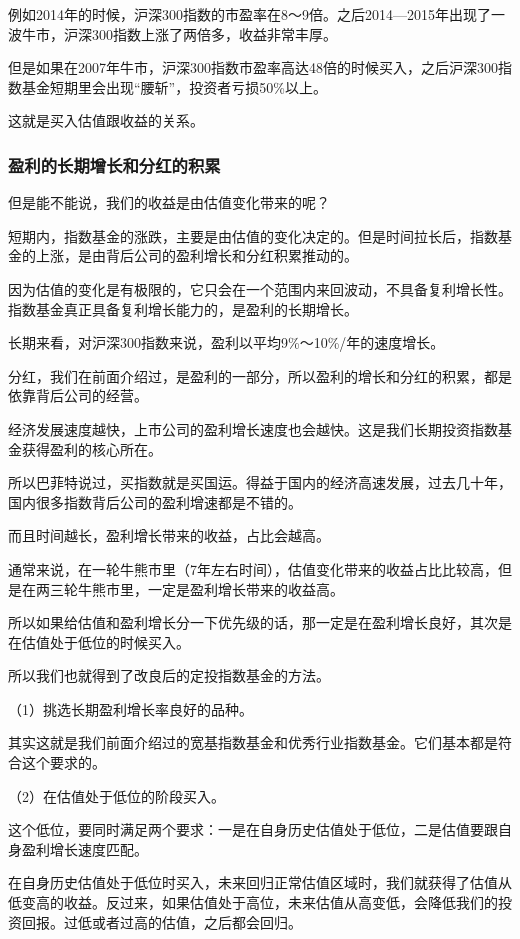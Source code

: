例如2014年的时候，沪深300指数的市盈率在8～9倍。之后2014—2015年出现了一波牛市，沪深300指数上涨了两倍多，收益非常丰厚。

但是如果在2007年牛市，沪深300指数市盈率高达48倍的时候买入，之后沪深300指数基金短期里会出现“腰斩”，投资者亏损50\%以上。

这就是买入估值跟收益的关系。

\subsubsection{盈利的长期增长和分红的积累}

但是能不能说，我们的收益是由估值变化带来的呢？

短期内，指数基金的涨跌，主要是由估值的变化决定的。但是时间拉长后，指数基金的上涨，是由背后公司的盈利增长和分红积累推动的。

因为估值的变化是有极限的，它只会在一个范围内来回波动，不具备复利增长性。指数基金真正具备复利增长能力的，是盈利的长期增长。

长期来看，对沪深300指数来说，盈利以平均9\%～10\%/年的速度增长。

分红，我们在前面介绍过，是盈利的一部分，所以盈利的增长和分红的积累，都是依靠背后公司的经营。

经济发展速度越快，上市公司的盈利增长速度也会越快。这是我们长期投资指数基金获得盈利的核心所在。

所以巴菲特说过，买指数就是买国运。得益于国内的经济高速发展，过去几十年，国内很多指数背后公司的盈利增速都是不错的。

而且时间越长，盈利增长带来的收益，占比会越高。

通常来说，在一轮牛熊市里（7年左右时间），估值变化带来的收益占比比较高，但是在两三轮牛熊市里，一定是盈利增长带来的收益高。

所以如果给估值和盈利增长分一下优先级的话，那一定是在盈利增长良好，其次是在估值处于低位的时候买入。

所以我们也就得到了改良后的定投指数基金的方法。

（1）挑选长期盈利增长率良好的品种。

其实这就是我们前面介绍过的宽基指数基金和优秀行业指数基金。它们基本都是符合这个要求的。

（2）在估值处于低位的阶段买入。

这个低位，要同时满足两个要求：一是在自身历史估值处于低位，二是估值要跟自身盈利增长速度匹配。

在自身历史估值处于低位时买入，未来回归正常估值区域时，我们就获得了估值从低变高的收益。反过来，如果估值处于高位，未来估值从高变低，会降低我们的投资回报。过低或者过高的估值，之后都会回归。

